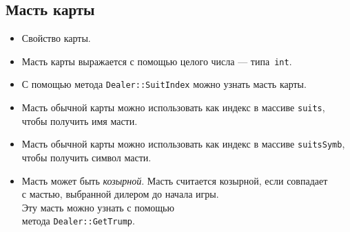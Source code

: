 \documentclass[a4paper,12pt]{article}
\begin{document}
        \subsection{Масть карты}
            \begin{itemize}
                \item[] Свойство карты.
                \item[] Масть карты выражается с помощью целого числа --- типа~\texttt{int}.
                \item[] С помощью метода \texttt{Dealer::SuitIndex} можно узнать масть карты.
                \item[] Масть обычной карты можно использовать как индекс в массиве \texttt{suits}, чтобы получить имя масти.
                \item[] Масть обычной карты можно использовать как индекс в массиве \texttt{suitsSymb}, чтобы получить символ масти.
                \item[] Масть может быть \textit{козырной}.
                        Масть считается козырной, если совпадает\\с мастью, выбранной дилером до начала игры.\\
                        Эту масть можно узнать с помощью\\метода \texttt{Dealer::GetTrump}.
            \end{itemize}
\end{document}

